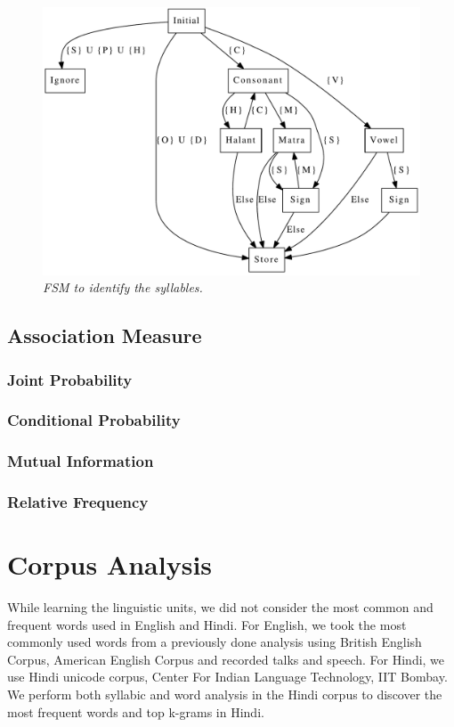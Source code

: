 \documentclass[12pt, a4paper]{report}
\begin{document}
\begin{figure}[!t]
\centering
\includegraphics[width=5in]{FSM.pdf}
\caption{\small \sl FSM to identify the syllables.}
\label{fig_FSM}
\end{figure}


\section{Association Measure}

\subsection{Joint Probability}
\subsection{Conditional Probability}
\subsection{Mutual Information}
\subsection{Relative Frequency}


\chapter{Corpus Analysis}
While learning the linguistic units, we did not consider the most common and frequent words used in English and Hindi. For English, we took the most commonly used words from a previously done analysis using British English Corpus, American English Corpus and recorded talks and speech\cite{}. For Hindi, we use Hindi unicode corpus, Center For Indian Language Technology, IIT Bombay\cite{}. We perform both syllabic and word analysis in the Hindi corpus to discover the most frequent words and top k-grams in Hindi. 
\end{document}
